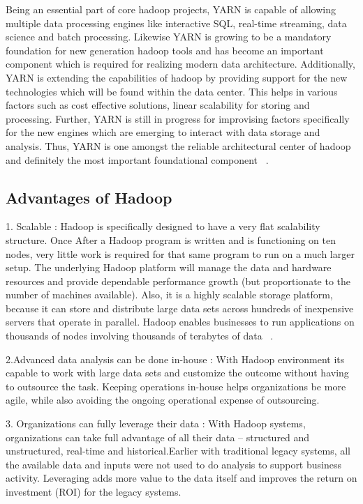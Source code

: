 Being an essential part of core hadoop projects, YARN is capable of allowing 
multiple data processing engines like interactive SQL, real-time streaming, data
science and batch processing. Likewise YARN is growing to be a mandatory 
foundation for new generation hadoop tools and has become an important component
which is required for realizing modern data architecture. Additionally, YARN is 
extending the capabilities of hadoop by providing support for the new 
technologies which will be found within the data center. This helps in various 
factors such as cost effective solutions, linear scalability for storing and 
processing. Further, YARN is still in progress for improvising factors 
specifically for the new engines which are emerging to interact with data 
storage and analysis. Thus, YARN is one amongst the reliable architectural 
center of hadoop  and definitely  the most important foundational component
~\cite{hid-sp18-406-hadoop-intro7}.

\subsection{Advantages of Hadoop}
1. Scalable : 
Hadoop is specifically designed to have a very flat scalability structure. 
Once After a Hadoop program is written and is functioning on ten nodes, very 
little work is required for that same program to run on a much larger setup. 
The underlying Hadoop platform will manage the data and hardware resources and 
provide dependable performance growth (but proportionate to the number of 
machines available). Also, it is a highly scalable storage platform, because it 
can store and distribute large data sets across hundreds of inexpensive servers 
that operate in parallel. Hadoop enables businesses to run applications on 
thousands of nodes involving thousands of terabytes of data
~\cite{hid-sp18-406-hadoop-intro8}.

2.Advanced data analysis can be done in-house : 
With Hadoop environment its capable to work with large data sets and customize 
the outcome without having to outsource the task. Keeping operations in-house 
helps organizations be more agile, while also avoiding the ongoing operational 
expense of outsourcing.

3. Organizations can fully leverage their data : 
With Hadoop systems, organizations can take full advantage of all their data – 
structured and unstructured, real-time and historical.Earlier with traditional 
legacy systems, all the available data and inputs were not used to do analysis 
to support business activity. Leveraging adds more value to the data itself and 
improves the return on investment (ROI) for the legacy systems.

